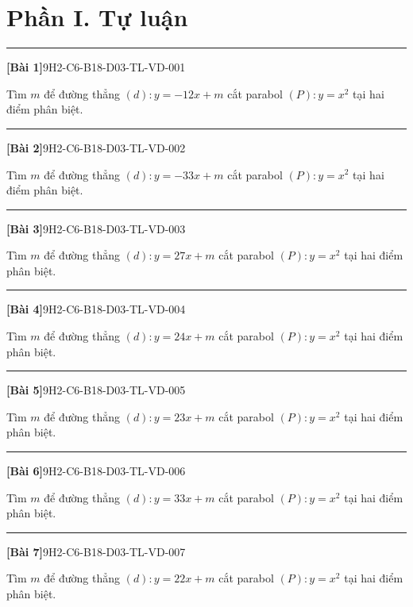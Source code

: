 \documentclass[12pt,a4paper]{article}
\newif\ifloigiai
\newenvironment{cauhoi}[2]{%
  \par\medskip\noindent\rule{\textwidth}{0.4pt}\par\nopagebreak
  \noindent\textbf{[#1]}\hfill{\scriptsize\ttfamily #2}\par\nopagebreak\smallskip}{\par}
\newcommand{\loigiai}[1]{\ifloigiai\par\smallskip\noindent\textit{Lời giải.} #1\par\fi}
\begin{document}
\section*{Phần I. Tự luận}
\begin{cauhoi}{Bài 1}{9H2-C6-B18-D03-TL-VD-001}
Tìm $m$ để đường thẳng $(d): y=-12x+m$ cắt parabol $(P): y=x^{2}$ tại hai điểm phân biệt.
\loigiai{Phương trình hoành độ giao điểm $x^{2}+12x-m=0$. Để $(d)$ cắt $(P)$ tại hai điểm phân biệt cần $\Delta=144+4m>0$, suy ra $m>-36$.}
\end{cauhoi}
\begin{cauhoi}{Bài 2}{9H2-C6-B18-D03-TL-VD-002}
Tìm $m$ để đường thẳng $(d): y=-33x+m$ cắt parabol $(P): y=x^{2}$ tại hai điểm phân biệt.
\loigiai{Phương trình hoành độ giao điểm $x^{2}+33x-m=0$. Để $(d)$ cắt $(P)$ tại hai điểm phân biệt cần $\Delta=1089+4m>0$, suy ra $m>-\dfrac{1089}{4}$.}
\end{cauhoi}
\begin{cauhoi}{Bài 3}{9H2-C6-B18-D03-TL-VD-003}
Tìm $m$ để đường thẳng $(d): y=27x+m$ cắt parabol $(P): y=x^{2}$ tại hai điểm phân biệt.
\loigiai{Phương trình hoành độ giao điểm $x^{2}-27x-m=0$. Để $(d)$ cắt $(P)$ tại hai điểm phân biệt cần $\Delta=729+4m>0$, suy ra $m>-\dfrac{729}{4}$.}
\end{cauhoi}
\begin{cauhoi}{Bài 4}{9H2-C6-B18-D03-TL-VD-004}
Tìm $m$ để đường thẳng $(d): y=24x+m$ cắt parabol $(P): y=x^{2}$ tại hai điểm phân biệt.
\loigiai{Phương trình hoành độ giao điểm $x^{2}-24x-m=0$. Để $(d)$ cắt $(P)$ tại hai điểm phân biệt cần $\Delta=576+4m>0$, suy ra $m>-144$.}
\end{cauhoi}
\begin{cauhoi}{Bài 5}{9H2-C6-B18-D03-TL-VD-005}
Tìm $m$ để đường thẳng $(d): y=23x+m$ cắt parabol $(P): y=x^{2}$ tại hai điểm phân biệt.
\loigiai{Phương trình hoành độ giao điểm $x^{2}-23x-m=0$. Để $(d)$ cắt $(P)$ tại hai điểm phân biệt cần $\Delta=529+4m>0$, suy ra $m>-\dfrac{529}{4}$.}
\end{cauhoi}
\begin{cauhoi}{Bài 6}{9H2-C6-B18-D03-TL-VD-006}
Tìm $m$ để đường thẳng $(d): y=33x+m$ cắt parabol $(P): y=x^{2}$ tại hai điểm phân biệt.
\loigiai{Phương trình hoành độ giao điểm $x^{2}-33x-m=0$. Để $(d)$ cắt $(P)$ tại hai điểm phân biệt cần $\Delta=1089+4m>0$, suy ra $m>-\dfrac{1089}{4}$.}
\end{cauhoi}
\begin{cauhoi}{Bài 7}{9H2-C6-B18-D03-TL-VD-007}
Tìm $m$ để đường thẳng $(d): y=22x+m$ cắt parabol $(P): y=x^{2}$ tại hai điểm phân biệt.
\loigiai{Phương trình hoành độ giao điểm $x^{2}-22x-m=0$. Để $(d)$ cắt $(P)$ tại hai điểm phân biệt cần $\Delta=484+4m>0$, suy ra $m>-121$.}
\end{cauhoi}
\end{document}
